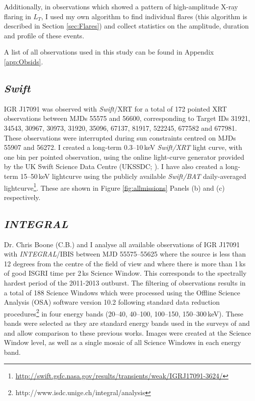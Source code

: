 \par Additionally, in observations which showed a pattern of high-amplitude X-ray flaring in $L_T$, I used my own algorithm to find individual flares (this algorithm is described in Section \ref{sec:Flares}) and collect statistics on the amplitude, duration and profile of these events.
\par A list of all observations used in this study can be found in Appendix \ref{app:Obsids}.

\subsection{\textit{Swift}}

\par IGR J17091 was observed with \indexswift\textit{Swift}/XRT for a total of 172 pointed XRT observations between MJDs 55575 and 56600, corresponding to Target IDs 31921, 34543, 30967, 30973, 31920, 35096, 67137, 81917, 522245, 677582 and 677981.  These observations were interrupted during sun constraints centred on MJDs 55907 and 56272.  I created a long-term 0.3--10\,keV \indexxrt\textit{Swift/XRT} light curve, with one bin per pointed observation, using the online light-curve generator provided by the UK Swift Science Data Centre (UKSSDC; \citealp{Evans_Swift1}).  I have also created a long-term 15--50\,keV lightcurve using the publicly available \indexbat\textit{Swift/BAT} daily-averaged lightcurve\footnote{\url{http://swift.gsfc.nasa.gov/results/transients/weak/IGRJ17091-3624/}}.  These are shown in Figure \ref{fig:allmissions} Panels (b) and (c) respectively.

\subsection{\textit{INTEGRAL}}

\par Dr. Chris Boone (\textsf{C.B.}) and I analyse all available observations of IGR J17091 with \indexintegral\indexibis\textit{INTEGRAL}/IBIS \citep{Ubertini_IBIS} between MJD 55575--55625 where the source is less than 12 degrees from the centre of the field of view and where there is more than 1\,ks of good ISGRI time per 2\,ks Science Window. This corresponds to the spectrally hardest period of the 2011-2013 outburst. The filtering of observations results in a total of 188 Science Windows which were processed using the Offline Science Analysis (OSA) software version 10.2 following standard data reduction procedures\footnote{http://www.isdc.unige.ch/integral/analysis} in four energy bands (20--40, 40--100, 100--150, 150--300\,keV). These bands were selected as they are standard energy bands used in the surveys of \citet{Bird_Survey} and \citet{Bazzano_Survey} and allow comparison to these previous works. Images were created at the Science Window level, as well as a single mosaic of all Science Windows in each energy band.

